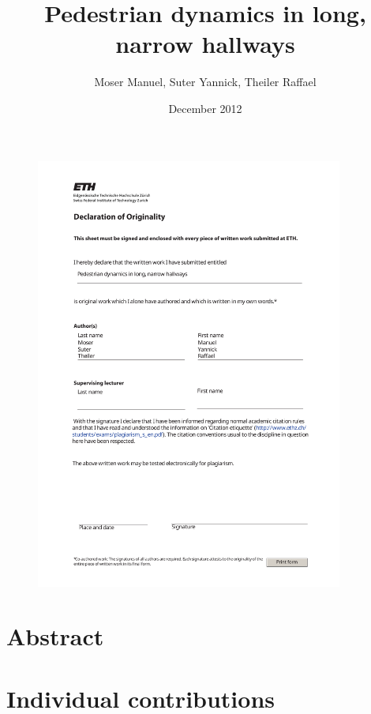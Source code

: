\documentclass[11pt]{article}
\title{Pedestrian dynamics in long, narrow hallways}
\author{Moser Manuel, Suter Yannick, Theiler Raffael}
\date{December 2012}
\begin{document}

\newpage


\newpage


\begin{figure}
	\centering
	\includegraphics[width=0.9\textwidth]{declaration_print.pdf}
	\label{fig:declaration}
\end{figure}
\newpage


\tableofcontents
\newpage


\section{Abstract}

\newpage

\section{Individual contributions}

\newpage
\end{document}
